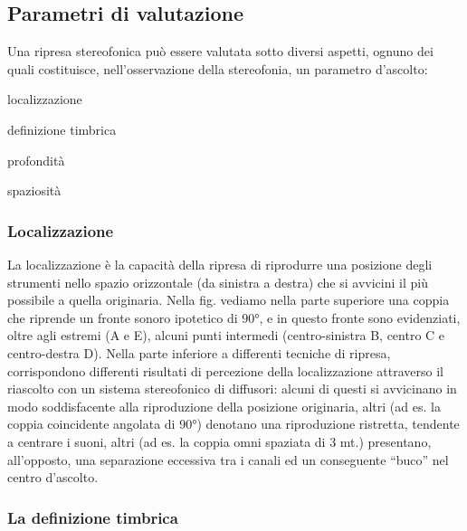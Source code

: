 \subsection*{Parametri di valutazione}

Una ripresa stereofonica può essere valutata sotto diversi aspetti, ognuno dei
quali costituisce, nell'osservazione della stereofonia, un parametro d’ascolto:

\begin{compactitem}
\item localizzazione
\item definizione timbrica
\item profondità
\item spaziosità
\end{compactitem}


\subsubsection*{Localizzazione}

La localizzazione è la capacità della ripresa di riprodurre una posizione degli
strumenti nello spazio orizzontale (da sinistra a destra) che si avvicini il più
possibile a quella originaria. Nella fig. %
vediamo nella
parte superiore una coppia che riprende un fronte sonoro ipotetico di $90°$, e
in questo fronte sono evidenziati, oltre agli estremi (A e E), alcuni punti
intermedi (centro-sinistra B, centro C e centro-destra D). Nella parte inferiore
a differenti tecniche di ripresa, corrispondono differenti risultati di
percezione della localizzazione attraverso il riascolto con un sistema
stereofonico di diffusori: alcuni di questi si avvicinano in modo soddisfacente
alla riproduzione della posizione originaria, altri (ad es. la coppia coincidente
angolata di 90°) denotano una riproduzione ristretta, tendente a centrare i
suoni, altri (ad es. la coppia omni spaziata di 3 mt.) presentano, all’opposto,
una separazione eccessiva tra i canali ed un conseguente “buco” nel centro
d’ascolto.

\subsubsection*{La definizione timbrica}

